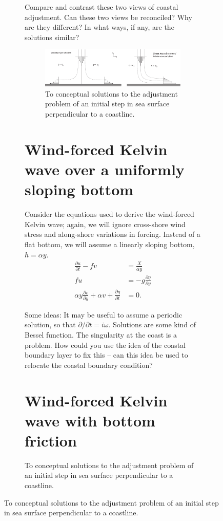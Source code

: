 \documentclass[11pt]{report}
\numberwithin{equation}{section}
\begin{document}
\begin{figure}
\begin{figure}
Compare and contrast these two views of coastal adjustment.  Can these two views be reconciled?  Why are they different?  In what ways, if any, are the solutions similar?

\begin{figure}[h]
    \centering
    \includegraphics[width=6.5in]{kelvin-vs-jet_adjustment}
    \caption{To conceptual solutions to the adjustment problem of an initial step in sea surface perpendicular to a coastline.}
    \label{fig:kelvin-vs-jet_adjustment}
\end{figure}

\clearpage

\section{Wind-forced Kelvin wave over a uniformly sloping bottom}
\label{prob:wind_forced_kelvin_wave}

Consider the equations used to derive the wind-forced Kelvin wave; again, we will ignore cross-shore wind stress and along-shore variations in forcing.  Instead of a flat bottom, we will assume a linearly sloping bottom, $h = \alpha y$.
\begin{align}
\frac{\partial u}{\partial t} - fv &=  \frac{X}{\alpha y} \\
    f u &= -g\frac{\partial \eta}{\partial y} \\
    \alpha y \frac{\partial v}{\partial y} + \alpha v + \frac{\partial \eta}{\partial t} &= 0.
\end{align}

Some ideas:  It may be useful to assume a periodic solution, so that $\partial/\partial t = i \omega$.  Solutions are some kind of Bessel function.  The singularity at the coast is a problem.  How could you use the idea of the coastal boundary layer to fix this -- can this idea be used to relocate the coastal boundary condition?

\section{Wind-forced Kelvin wave with bottom friction} 
\label{prob:wind_forced_kelvin_wave_friction}


\end{figure}
\end{figure}
\end{document}
